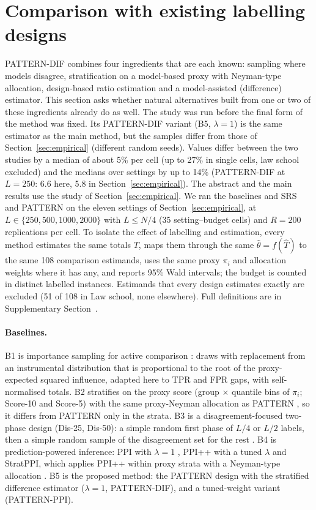 \section{Comparison with existing labelling designs}\label{sec:baselines}

PATTERN-DIF combines four ingredients that are each known: sampling where models disagree, stratification on a model-based proxy with Neyman-type allocation, design-based ratio estimation and a model-assisted (difference) estimator. This section asks whether natural alternatives built from one or two of these ingredients already do as well. The study was run before the final form of the method was fixed. Its PATTERN-DIF variant (B5, $\lambda=1$) is the same estimator as the main method, but the samples differ from those of Section~\ref{sec:empirical} (different random seeds). Values differ between the two studies by a median of about 5\% per cell (up to 27\% in single cells, law school excluded) and the medians over settings by up to 14\% (PATTERN-DIF at $L=250$: 6.6 here, 5.8 in Section~\ref{sec:empirical}). The abstract and the main results use the study of Section~\ref{sec:empirical}. We ran the baselines and SRS and PATTERN on the eleven settings of Section~\ref{sec:empirical}, at $L\in\{250,500,1000,2000\}$ with $L\le N/4$ (35 setting--budget cells) and $R=200$ replications per cell. To isolate the effect of labelling and estimation, every method estimates the same totals $T$, maps them through the same $\hat\theta=f(\hat T)$ to the same 108 comparison estimands, uses the same proxy $\pi_i$ and allocation weights where it has any, and reports 95\% Wald intervals; the budget is counted in distinct labelled instances. Estimands that every design estimates exactly are excluded (51 of 108 in Law school, none elsewhere). Full definitions are in Supplementary Section~.

\paragraph{Baselines.} B1 is importance sampling for active comparison \citep{sawade2012active}: draws with replacement from an instrumental distribution that is proportional to the root of the proxy-expected squared influence, adapted here to TPR and FPR gaps, with self-normalised totals. B2 stratifies on the proxy score (group $\times$ quantile bins of $\pi_i$; Score-10 and Score-5) with the same proxy-Neyman allocation as PATTERN \citep{bennett2010online,kumar2018classifier}, so it differs from PATTERN only in the strata. B3 is a disagreement-focused two-phase design (Dis-25, Dis-50): a simple random first phase of $L/4$ or $L/2$ labels, then a simple random sample of the disagreement set for the rest \citep{sawade2012active,musgrove2023discordant}. B4 is prediction-powered inference: PPI with $\lambda=1$ \citep{angelopoulos2023ppi}, PPI++ with a tuned $\lambda$ \citep{angelopoulos2026ppipp} and StratPPI, which applies PPI++ within proxy strata with a Neyman-type allocation \citep{fisch2024stratppi}. B5 is the proposed method: the PATTERN design with the stratified difference estimator ($\lambda=1$, PATTERN-DIF), and a tuned-weight variant (PATTERN-PPI).

